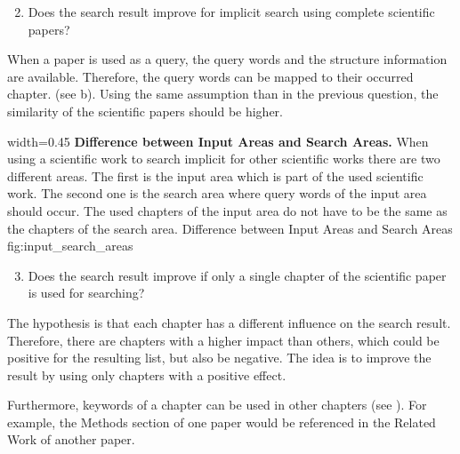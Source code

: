 \begin{enumerate}
  \setcounter{enumi}{1}
  \item Does the search result improve for implicit search using complete scientific papers?
\end{enumerate}

When a paper is used as a query, the query words and the structure information are available. Therefore, the query words can be mapped to their occurred chapter. (see  b). Using the same assumption than in the previous question, the similarity of the scientific papers should be higher.

      {width=0.45\textwidth}
      {\textbf{Difference between Input Areas and Search Areas.} When using a scientific work to search implicit for other scientific works there are two different areas. The first is the input area which is part of the used scientific work. The second one is the search area where query words of the input area should occur. The used chapters of the input area do not have to be the same as the chapters of the search area.}
      {Difference between Input Areas and Search Areas}
      {fig:input_search_areas}

\begin{enumerate}
  \setcounter{enumi}{2}
  \item Does the search result improve if only a single chapter of the scientific paper is used for searching?
\end{enumerate}

The hypothesis is that each chapter has a different influence on the search result. Therefore, there are chapters with a higher impact than others, which could be positive for the resulting list, but also be negative. The idea is to improve the result by using only chapters with a positive effect.

Furthermore, keywords of a chapter can be used in other chapters (see ). For example, the Methods section of one paper would be referenced in the Related Work of another paper.
